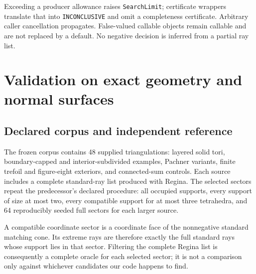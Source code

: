 \documentclass[11pt,letterpaper]{article}
\theoremstyle{definition}
\theoremstyle{remark}\newtheorem{remark}[theorem]{Remark}
\newcommand{\code}[1]{\nolinkurl{#1}}
\begin{document}
Exceeding a producer allowance raises \code{SearchLimit}; certificate
wrappers translate that into \code{INCONCLUSIVE} and omit a completeness
certificate. Arbitrary caller cancellation propagates. False-valued
callable objects remain callable and are not replaced by a default.
No negative decision is inferred from a partial ray list.

\section{Validation on exact geometry and normal surfaces}
\label{sec:validation}

\subsection{Declared corpus and independent reference}

The frozen corpus contains 48 supplied triangulations: layered solid tori,
boundary-capped and interior-subdivided examples, Pachner variants,
finite trefoil and figure-eight exteriors, and connected-sum controls.
Each source includes a complete standard-ray list produced with Regina.
The selected sectors repeat the predecessor's declared procedure:
all occupied supports, every support of size at most two, every compatible
support for at most three tetrahedra, and 64 reproducibly seeded full
sectors for each larger source.

A compatible coordinate sector is a coordinate face of the nonnegative
standard matching cone. Its extreme rays are therefore exactly the full
standard rays whose support lies in that sector. Filtering the complete
Regina list is consequently a complete oracle for each selected sector;
it is not a comparison only against whichever candidates our code happens
to find.
\end{document}
